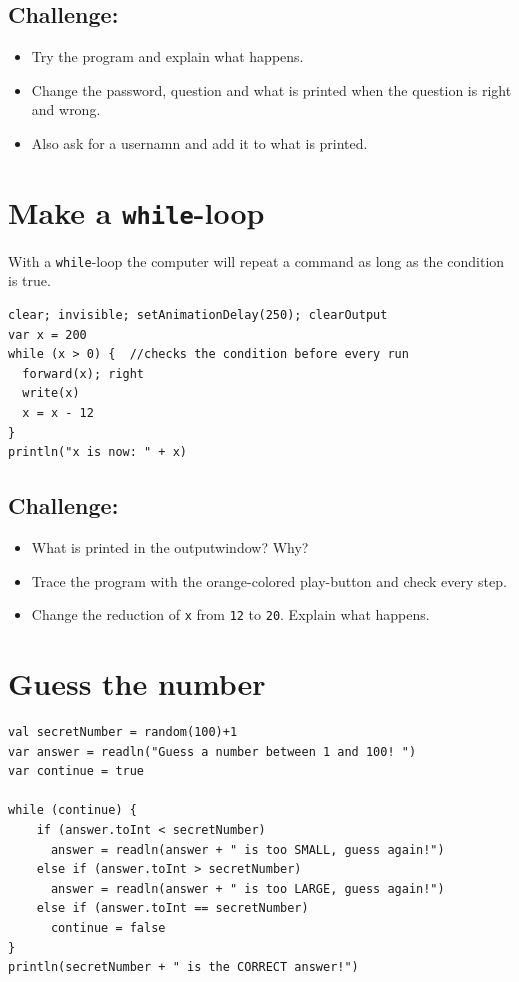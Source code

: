 \section*{\color{BrickRed}Challenge:}


\begin{itemize}

\item {Try the program and explain what happens.}
\item {Change the password, question and what is printed when the question is right and wrong.}
\item {Also ask for a usernamn and add it to what is printed.}

\end{itemize}


\chapter{Make a \lstinline{while}-loop}With a \lstinline{while}-loop the computer will repeat a command as long as the condition is true.

\begin{lstlisting}[basicstyle={\ttfamily\fontsize{22}{27}\selectfont},numbers=none]
clear; invisible; setAnimationDelay(250); clearOutput
var x = 200
while (x > 0) {  //checks the condition before every run 
  forward(x); right
  write(x) 
  x = x - 12
}
println("x is now: " + x)
\end{lstlisting}
        
\section*{\color{BrickRed}Challenge:}


\begin{itemize}

\item {What is printed in the outputwindow? Why?}
\item {Trace the program with the orange-colored play-button and check every step.}
\item {Change the reduction of \lstinline{x} from \lstinline{12} to \lstinline{20}. Explain what happens.}

\end{itemize}


\chapter{Guess the number}
\begin{lstlisting}[basicstyle={\ttfamily\fontsize{16}{19}\selectfont},numbers=none]
val secretNumber = random(100)+1
var answer = readln("Guess a number between 1 and 100! ")
var continue = true

while (continue) {
    if (answer.toInt < secretNumber)
      answer = readln(answer + " is too SMALL, guess again!")
    else if (answer.toInt > secretNumber)
      answer = readln(answer + " is too LARGE, guess again!")
    else if (answer.toInt == secretNumber)
      continue = false
}
println(secretNumber + " is the CORRECT answer!")
\end{lstlisting}
        

